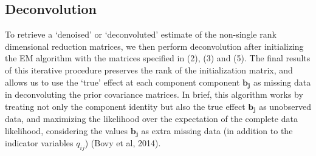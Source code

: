 \begin{enumerate}
\subsection{Deconvolution}
To retrieve a `denoised' or `deconvoluted' estimate of the non-single rank dimensional reduction matrices, we then perform deconvolution after initializing the EM algorithm with  the matrices specified in (2), (3) and (5). The final results of this iterative procedure preserves the rank of the initialization matrix, and allows us to use the `true' effect at each component component $\bm{{b}_{j}}$ as missing data in deconvoluting the prior covariance matrices. In brief, this algorithm works by treating not only the component identity but also the true effect $\bm{{b}_{j}}$  as unobserved data, and maximizing the likelihood over the expectation of the complete data likelihood, considering the values $\bm{{b}_{j}}$ as extra missing data (in addition to the indicator variables $q_{ij}$) (Bovy et al, 2014). 
%
%
%
%

%
%


\end{enumerate}
